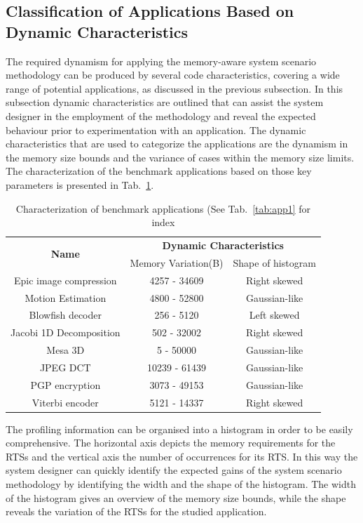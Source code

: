 \subsection{Classification of Applications Based on Dynamic Characteristics}
\label{sec:categorisationC}
The required dynamism for applying the memory-aware system scenario methodology can be produced by several code characteristics, covering a wide range of potential applications, as discussed in the previous subsection. 
In this subsection dynamic characteristics are outlined that can assist the system designer in the employment of the methodology and reveal the expected behaviour prior to experimentation with an application. 
The dynamic characteristics that are used to categorize the applications are the dynamism in the memory size bounds and the variance of cases within the memory size limits.
The characterization of the benchmark applications based on those key parameters is presented in Tab.~\ref{tab:app2}.

\begin{table}
\caption{Characterization of benchmark applications (See Tab.~\ref{tab:app1} for index}
\label{tab:app2}
{
\begin{tabular}{|c|c|c|}
\hline
\multirow{2}{*}{\textbf{Name}} & \multicolumn{2}{c|}{\textbf{Dynamic Characteristics}} \\ \cline{2-3}
 & Memory Variation(B) & Shape of histogram\\ 
\hline 
Epic image compression & 4257 - 34609  & Right skewed \\ 
\hline 
Motion Estimation & 4800 - 52800  & Gaussian-like \\ 
\hline 
Blowfish decoder & 256 - 5120 & Left skewed \\ 
\hline 
Jacobi 1D Decomposition & 502 - 32002 & Right skewed \\ 
\hline 
Mesa 3D & 5 - 50000 & Gaussian-like\\ 
\hline 
JPEG DCT & 10239 - 61439 & Gaussian-like \\ 
\hline 
PGP encryption & 3073 - 49153 & Gaussian-like \\ 
\hline 
Viterbi encoder & 5121 - 14337 & Right skewed \\ 
\hline 
\end{tabular}}
\end{table}

The profiling information can be organised into a histogram in order to be easily comprehensive. 
The horizontal axis depicts the memory requirements for the RTSs and the vertical axis the number of occurrences for its RTS. 
In this way the system designer can quickly identify the expected gains of the system scenario methodology by identifying the width and the shape of the histogram. 
The width of the histogram gives an overview of the memory size bounds, while the shape reveals the variation of the RTSs for the studied application.

